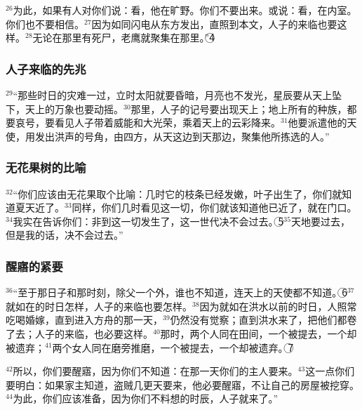 $^{26}$为此，如果有人对你们说：看，他在旷野。你们不要出来。或说：看，在内室。你们也不要相信。$^{27}$因为如同闪电从东方发出，直照到本文，人子的来临也要这样。$^{28}$无论在那里有死尸，老鹰就聚集在那里。”\textcircled{4}


\subsubsection{人子来临的先兆}
$^{29}$“那些时日的灾难一过，立时太阳就要昏暗，月亮也不发光，星辰要从天上坠下，天上的万象也要动摇。$^{30}$那里，人子的记号要出现天上；地上所有的种族，都要哀号，要看见人子带着威能和大光荣，乘着天上的云彩降来。$^{31}$他要派遣他的天使，用发出洪声的号角，由四方，从天这边到天那边，聚集他所拣选的人。”


\subsubsection{无花果树的比喻}
$^{32}$“你们应该由无花果取个比喻：几时它的枝条已经发嫩，叶子出生了，你们就知道夏天近了。$^{33}$同样，你们几时看见这一切，你们就该知道他已近了，就在门口。$^{34}$我实在告诉你们：非到这一切发生了，这一世代决不会过去。\textcircled{5}$^{35}$天地要过去，但是我的话，决不会过去。”


\subsubsection{醒寤的紧要}
$^{36}$“至于那日子和那时刻，除父一个外，谁也不知道，连天上的天使都不知道。\textcircled{6}$^{37}$就如在\UL[诺厄]的时日怎样，人子的来临也要怎样。$^{38}$因为就如在洪水以前的时日，人照常吃喝婚嫁，直到\UL[诺厄]进入方舟的那一天，$^{39}$仍然没有觉察；直到洪水来了，把他们都卷了去；人子的来临，也必要这样。$^{40}$那时，两个人同在田间，一个被提去，一个却被遗弃；$^{41}$两个女人同在磨旁推磨，一个被提去，一个却被遗弃。\textcircled{7}

$^{42}$所以，你们要醒寤，因为你们不知道：在那一天你们的主人要来。$^{43}$这一点你们要明白：如果家主知道，盗贼几更天要来，他必要醒寤，不让自己的房屋被挖穿。$^{44}$为此，你们应该准备，因为你们不料想的时辰，人子就来了。”


